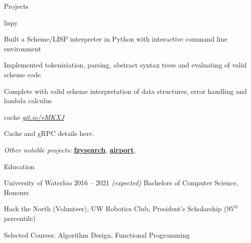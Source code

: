 \documentclass{resume} %
\begin{document}
\begin{rSection}{Projects}
\begin{rSubsection}{lispy}
    \item Built a Scheme/LISP interpreter in Python with interactive command line environment
    \item Implemented tokeniziation, parsing, abstract syntax trees and evaluating of valid scheme code
    \item Complete with valid scheme interpretation of data structures, error handling and lambda calculus
  \end{rSubsection}
  
  \begin{rSubsection}{cache}
	  {\em{ \href{http://github.com/ridwanmsharif/airport}
		    {git.io/vMKXJ}}}
	  {}

    \item Cache and gRPC details here.
  \end{rSubsection}

  \begin{rMinisection}
    \item {\em Other notable projects:}
      \href{https://github.com/uber/go-torch}{\textbf{fzysearch}},
      \href{https://github.com/coreos/etcd}{\textbf{airport}},
  \end{rMinisection}
\end{rSection}


\begin{rSection}{Education}
  \begin{rSubsection}{University of Waterloo}
		     {2016 -- 2021 \em (expected)}
		     {Bachelors of Computer Science, Honours}
		     {}
    \item Hack the North (Volunteer), UW Robotics Club,
		President's Scholarship ($95^{th}$ percentile)
    \item Selected Courses: Algorithm Design, Functional Programming
  \end{rSubsection}
\end{rSection} 


\end{document}
